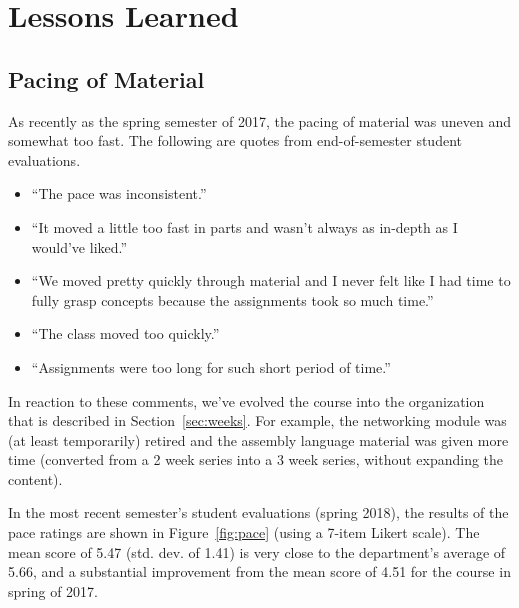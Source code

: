 \section{Lessons Learned}
\label{sec:lessons}


\subsection{Pacing of Material}



As recently as the spring semester of 2017, the pacing of material
was uneven and somewhat too fast.  The following are quotes from
end-of-semester student evaluations.
\begin{itemize}
\item ``The pace was inconsistent.''
\item ``It moved a little too fast in parts and wasn't always as
in-depth as I would've liked.''
\item ``We moved pretty quickly through material and I never felt like I had
time to fully grasp concepts because the assignments took so much time.''
\item ``The class moved too quickly.''
\item ``Assignments were too long for such short period of time.''
\end{itemize}
In reaction to these comments, we've evolved the course into the organization
that is described in Section~\ref{sec:weeks}.
For example, the networking module was (at least temporarily) retired
and the assembly language material was given more time (converted from a
2 week series into a 3 week series, without expanding the content).

In the most recent semester's student evaluations (spring 2018),
the results of the pace ratings are shown in Figure~\ref{fig:pace}
(using a 7-item Likert scale).
The mean score of 5.47 (std. dev. of 1.41)
is very close to the department's average of
5.66, and a substantial improvement from the mean score of 4.51
for the course in spring of 2017.

